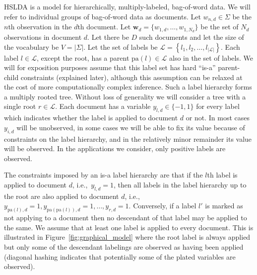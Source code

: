 
\label{sec:model} 

HSLDA is a model for hierarchically, multiply-labeled, bag-of-word data.  We
will refer to individual groups of bag-of-word data as documents.  Let $w_{n,d}
\in \Sigma$ be the $n$th observation in the $d$th document.  Let $\mathbf{w}_d
= \{w_{1,d},\ldots,w_{1,N_d}\}$ be the  set of $N_d$ observations in document
$d$.  Let there be $D$ such documents and let the size of the vocabulary be
$V=|\Sigma|$.  Let the set of labels be $\mathcal{L}=\left\{
  l_{1},l_{2},\ldots,l_{\left|\mathcal{L}\right|}\right\} $. Each label
$l \in \mathcal{L}$, except the root, has a parent $\mathrm{pa}(l) \in \mathcal{L}$
also in the set of labels. 
 We will for exposition purposes assume that this label set has hard ``is-a''
 parent-child constraints (explained later), although this assumption can be
 relaxed at the cost of more computationally complex inference.  Such a label hierarchy forms a multiply rooted tree.  Without loss of generality we will consider a tree with a single root $r\in\mathcal{L}$.  Each document has a variable $y_{l,d} \in \{-1,1\}$ for every label which indicates whether the label is applied to document $d$ or not.   In most cases $y_{i,d}$ will be unobserved, in some cases we will be able to fix its value because of  constraints on the label hierarchy, and in the relatively minor remainder its value will be observed.  In the applications we consider, only positive labels are observed. 
 
The constraints imposed by an is-a label hierarchy are that if the $l$th label is applied to document $d$, i.e.,~$y_{l,d} = 1$, then all labels in the label hierarchy up to the root are also applied to document $d$, i.e.,~$y_{\mathrm{pa}(l),d} = 1, y_{\mathrm{pa}(\mathrm{pa}(l)),d} = 1, \ldots, y_{r,d}=1.$  Conversely, if a label $l'$ is marked as not applying to a document then no descendant of that label may be applied to the same.   We assume that at least one label is applied to every document.  This is illustrated in Figure~\ref{fig:graphical_model} where the root label is always applied but only some of the descendant labelings are observed as having been applied (diagonal hashing indicates that potentially some of the plated variables are observed).

